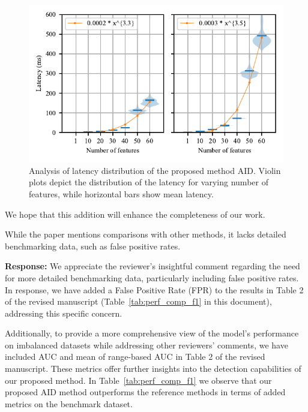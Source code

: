 \documentclass{article}
\makeatletter
\newenvironment{comment}{
\begin{sloppypar}\slshape
\vspace{5 mm}
\color{blue}
 \@beginparpenalty\@M
  \begin{list}{}{\setlength{\topsep}{0ex}%
  \setlength{\leftmargin}{\rightmargin}}\item[]
 \@beginparpenalty\@endparpenalty
}
{\end{list}
\end{sloppypar}
}
\makeatother
\begin{document}
\begin{enumerate}
        \begin{figure}
            \centering
            \includegraphics[width=\textwidth]{scalability.pdf}
            \caption{Analysis of latency distribution of the proposed method AID. Violin plots depict the distribution of the latency for varying number of features, while horizontal bars show mean latency.}
            \label{fig:latency}
        \end{figure}

        We hope that this addition will enhance the completeness of our work.

  \item
        \begin{comment}
        While the paper mentions comparisons with other methods, it lacks detailed benchmarking data, such as false positive rates.
        \end{comment}
        {\bf Response:}
        We appreciate the reviewer's insightful comment regarding the need for more detailed benchmarking data, particularly including false positive rates. In response, we have added a False Positive Rate (FPR) to the results in Table 2 of the revised manuscript (Table~\ref{tab:perf_comp_f1} in this document), addressing this specific concern.

        Additionally, to provide a more comprehensive view of the model's performance on imbalanced datasets while addressing other reviewers' comments, we have included AUC and mean of range-based AUC in Table 2 of the revised manuscript. These metrics offer further insights into the detection capabilities of our proposed method. In Table~\ref{tab:perf_comp_f1} we observe that our proposed AID method outperforms the reference methods in terms of added metrics on the benchmark dataset.


\end{enumerate}
\end{document}
